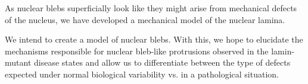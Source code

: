 As nuclear blebs superficially look like they might arise from mechanical defects of the nucleus, we have developed a mechanical model of the nuclear lamina. 

We intend to create a model of nuclear blebs. With this, we hope to elucidate the mechanisms responsible for nuclear bleb-like protrusions observed in the lamin-mutant disease states and allow us to differentiate between the type of defects expected under normal biological variability vs. in a pathological situation. 